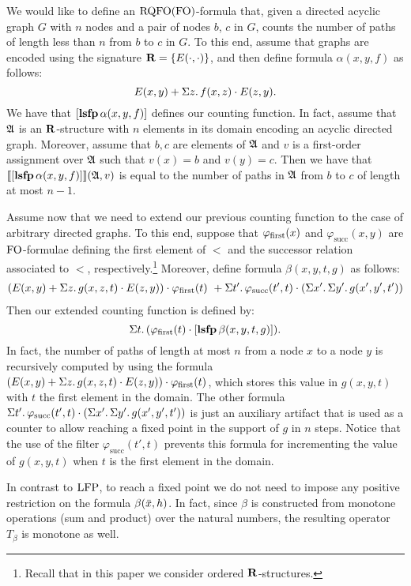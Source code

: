 \begin{exa} \label{ex:count-path}
We would like to define an ${\rm RQFO}({\rm FO})$-formula that, given a directed acyclic graph $G$ with $n$ nodes and a pair of nodes $b$, $c$ in $G$, counts the number of paths of length less than $n$ from $b$ to $c$ in $G$. To this end, assume that graphs are encoded using the signature $\mathbf{R} = \{ E(\cdot,\cdot)\}$, and then define formula $\alpha(x, y, f)$ as follows:
$$ 
E(x,y) + \Sigma{z}.\, f(x,z)\cdot E(z,y).
$$
We have that $[{\bf lsfp} \, \alpha(x,y,f)]$ defines our counting function. In fact, assume that $\mathfrak{A}$ is an $\mathbf{R}$-structure with $n$ elements in its domain encoding an acyclic directed graph. Moreover, assume that $b,c$ are elements of $\mathfrak{A}$ and $v$ is a first-order assignment over $\mathfrak{A}$ such that $v(x) = b$ and $v(y) = c$. Then we have that ${\llbracket{}{[{\bf lsfp} \, \alpha(x,y,f)]}\rrbracket}(\mathfrak{A},v)$ is equal to the number of paths in $\mathfrak{A}$ from $b$ to $c$ of length at most $n-1$.

Assume now that we need to extend our previous counting function to the case of arbitrary directed graphs. To this end, suppose that $\varphi_{\text{\rm first}}(x)$ and $\varphi_{\text{succ}}(x,y)$ are ${\rm FO}$-formulae defining the first element of $<$ and the successor relation associated to $<$, respectively.\footnote{Recall that in this paper we consider ordered $\mathbf{R}$-structures.} Moreover, define formula $\beta(x, y, t, g)$ as follows:
\begin{align*}
(E(x,y) + \Sigma{z}.\, g(x,z,t)\cdot E(z,y)) \cdot \varphi_{\text{\rm first}}(t) \ +
\Sigma{t'}.\, \varphi_{\text{succ}}(t',t) \cdot \left(\Sigma{x'}.\, \Sigma{y'}.\, g(x',y',t') \right)
\end{align*}
Then our extended counting function is defined by:
$$
\Sigma{t}.\, (\varphi_{\text{\rm first}}(t) \cdot [{\bf lsfp} \, \beta(x,y,t,g)]).
$$ 
In fact, the number of paths of length at most $n$ from a node $x$ to a node $y$ is recursively computed by using the formula $(E(x,y) + \Sigma{z}.\, g(x,z,t)\cdot E(z,y)) \cdot \varphi_{\text{\rm first}}(t)$, which stores this value in $g(x,y,t)$ with $t$ the first element in the domain.  The other formula $\Sigma{t'}.\, \varphi_{\text{succ}}(t',t) \cdot \left(\Sigma{x'}.\, \Sigma{y'}.\, g(x',y',t') \right)$ is just an auxiliary artifact that is used as a counter to allow reaching a fixed point in the support of $g$ in $n$ steps. Notice that the use of the filter $\varphi_{\text{succ}}(t',t)$ prevents this formula for incrementing the value of $g(x,y,t)$ when $t$ is the first element in the domain.
\end{exa}
In contrast to ${\rm LFP}$, to reach a fixed point we do not need to impose any positive restriction on the formula $\beta(\bar{x},h)$.
In fact, since $\beta$ is constructed from monotone operations (sum and product) over the natural numbers, the resulting operator $T_{\beta}$ is monotone as well.


